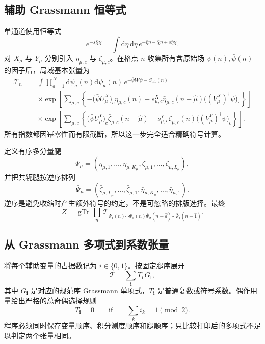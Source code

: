\documentclass[UTF8,11pt]{ctexart}
\newcommand{\dd}{\mathrm{d}}
\newcommand{\gTr}{\operatorname{gTr}}
\newcommand{\bpsi}{\bar\psi}
\newcommand{\cT}{\mathcal{T}}
\begin{document}
\subsection{辅助 Grassmann 恒等式}
单通道使用恒等式
\begin{equation}
 e^{-s\bar\chi\chi}
 =\int \dd\bar\eta\,\dd\eta\,
 e^{-\bar\eta\eta-\bar\chi\eta+s\bar\eta\chi}.
\end{equation}
对 $X_\mu$ 与 $Y_\mu$ 分别引入 $\eta_{\mu,c}$ 与 $\zeta_{\mu,c}$。在格点 $n$ 收集所有含原始场 $\psi(n),\bpsi(n)$ 的因子后，局域基本张量为
\begin{align}
\cT_n={}&\int\prod_{a=1}^{N}\dd\psi_a(n)\dd\bar\psi_a(n)\,
 e^{-\bpsi W\psi-S_{\mathrm{int}}(n)} \nonumber\\
&\times\exp\!\left[\sum_{\mu,c}
 \left\{-\bigl(\bpsi U^X_\mu\bigr)_c\eta_{\mu,c}(n)
 +s^X_{\mu,c}\bar\eta_{\mu,c}(n-\hat\mu)
 \bigl((V^X_\mu)^\dagger\psi\bigr)_c\right\}\right]\\
&\times\exp\!\left[\sum_{\mu,c}
 \left\{\bigl(\bpsi U^Y_\mu\bigr)_c\bar\zeta_{\mu,c}(n-\hat\mu)
 +s^Y_{\mu,c}\zeta_{\mu,c}(n)
 \bigl((V^Y_\mu)^\dagger\psi\bigr)_c\right\}\right].
\end{align}
所有指数都因幂零性而有限截断，所以这一步完全适合精确符号计算。

定义有序多分量腿
\begin{equation}
 \Psi_\mu=(\eta_{\mu,1},\ldots,\eta_{\mu,K_\mu},
                 \zeta_{\mu,1},\ldots,\zeta_{\mu,L_\mu}),
\end{equation}
并把共轭腿按逆序排列
\begin{equation}
 \bar\Psi_\mu=(\bar\zeta_{\mu,L_\mu},\ldots,\bar\zeta_{\mu,1},
                 \bar\eta_{\mu,K_\mu},\ldots,\bar\eta_{\mu,1}).
\end{equation}
逆序是避免收缩时产生额外符号的约定，不是可忽略的排版选择。最终
\begin{equation}
 Z=\gTr\prod_n
 \cT_{\Psi_1(n)\cdots\Psi_d(n)
 \bar\Psi_d(n-\hat d)\cdots\bar\Psi_1(n-\hat1)}.
\end{equation}

\subsection{从 Grassmann 多项式到系数张量}
将每个辅助变量的占据数记为 $i\in\{0,1\}$。按固定腿序展开
\begin{equation}
 \cT=\sum_{\bm i}T_{\bm i}\,G_{\bm i},
\end{equation}
其中 $G_{\bm i}$ 是对应的规范序 Grassmann 单项式，$T_{\bm i}$ 是普通复数或符号系数。偶作用量给出严格的总奇偶选择规则
\begin{equation}
 T_{\bm i}=0\qquad\text{if}\qquad \sum_k i_k=1\pmod 2.
\end{equation}
程序必须同时保存变量顺序、积分测度顺序和腿顺序；只比较打印后的多项式不足以判定两个张量相同。
\end{document}
